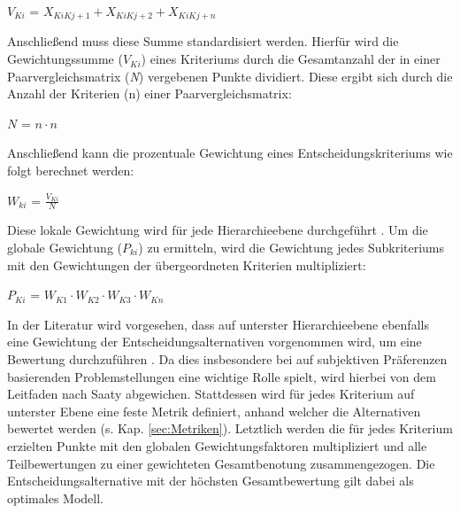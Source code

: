  \vspace{-6mm}
 \begin{center}
	$V_{Ki}$ = $X_{KiKj+1}+X_{KiKj+2}+X_{KiKj+n}$	
 \end{center}
Anschließend muss diese Summe standardisiert werden. Hierfür wird die Gewichtungssumme ($V_{Ki}$) eines Kriteriums durch die Gesamtanzahl der in einer Paarvergleichsmatrix (\textit{N}) vergebenen Punkte dividiert. Diese ergibt sich durch die Anzahl der Kriterien (n) einer Paarvergleichsmatrix:
\vspace{-2mm}
\begin{center}
   $N$ = $ n \cdot n $	
\end{center}
Anschließend kann die prozentuale Gewichtung eines Entscheidungskriteriums wie folgt berechnet werden:
 \vspace{-2mm}
 \begin{center}
	$W_{ki}$ = $\frac{V_{Ki}}{N}$	
 \end{center}
Diese lokale Gewichtung wird für jede Hierarchieebene durchgeführt \cite[14341]{Ishizaka.2011}. Um die globale Gewichtung ($P_{ki}$) zu ermitteln, wird die Gewichtung jedes Subkriteriums mit den Gewichtungen der übergeordneten Kriterien multipliziert:
\vspace{-2mm}
 \begin{center}
	$P_{Ki}$ = $W_{K1} \cdot W_{K2} \cdot W_{K3} \cdot W_{Kn} $	
 \end{center}
In der Literatur wird vorgesehen, dass auf unterster Hierarchieebene ebenfalls eine Gewichtung der Entscheidungsalternativen vorgenommen wird, um eine Bewertung durchzuführen \cite[88]{Saaty.2008}. Da dies insbesondere bei auf subjektiven Präferenzen basierenden Problemstellungen eine wichtige Rolle spielt, wird hierbei von dem Leitfaden nach Saaty abgewichen. Stattdessen wird für jedes Kriterium auf unterster Ebene eine feste Metrik definiert, anhand welcher die Alternativen bewertet werden (s. Kap. \ref{sec:Metriken}). Letztlich werden die für jedes Kriterium erzielten Punkte mit den globalen Gewichtungsfaktoren multipliziert und alle Teilbewertungen zu einer gewichteten Gesamtbenotung zusammengezogen. Die Entscheidungsalternative mit der höchsten Gesamtbewertung gilt dabei als optimales Modell.\\ 
